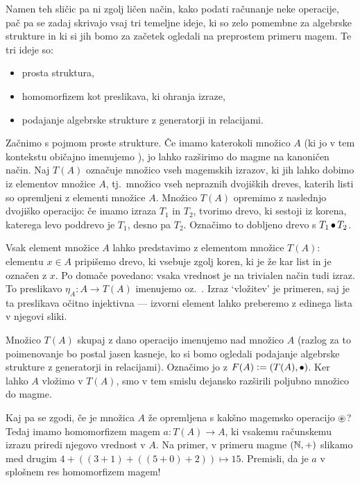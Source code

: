 
Namen teh sličic pa ni zgolj ličen način, kako podati računanje neke operacije, pač pa se zadaj skrivajo vsaj tri temeljne ideje, ki so zelo pomembne za algebrske strukture in ki si jih bomo za začetek ogledali na preprostem primeru magem. Te tri ideje so:
\begin{itemize}
	\item
		prosta struktura,
	\item
		homomorfizem kot preslikava, ki ohranja izraze,
	\item
		podajanje algebrske strukture z generatorji in relacijami.
\end{itemize}

Začnimo s pojmom proste strukture. Če imamo katerokoli množico $A$ (ki jo v tem kontekstu običajno imenujemo ), jo lahko razširimo do magme na kanoničen način. Naj $T(A)$ označuje množico vseh magemskih izrazov, ki jih lahko dobimo iz elementov množice $A$, tj.~množico vseh nepraznih dvojiških dreves, katerih listi so opremljeni z elementi množice $A$. Množico $T(A)$ opremimo z naslednjo dvojiško operacijo: če imamo izraza $T_1$ in $T_2$, tvorimo drevo, ki sestoji iz korena, katerega levo poddrevo je $T_1$, desno pa $T_2$. Označimo to dobljeno drevo s $T_1 \mathop{\bullet}\nolimits T_2$.

Vsak element množice $A$ lahko predstavimo z elementom množice $T(A)$: elementu $x \in A$ pripišemo drevo, ki vsebuje zgolj koren, ki je že kar list in je označen z $x$. Po domače povedano: vsaka vrednost je na trivialen način tudi izraz. To preslikavo $\eta_A\colon A \to T(A)$ imenujemo  oz.~. Izraz `vložitev' je primeren, saj je ta preslikava očitno injektivna --- izvorni element lahko preberemo z edinega lista v njegovi sliki.

Množico $T(A)$ skupaj z dano operacijo imenujemo  nad množico $A$ (razlog za to poimenovanje bo postal jasen kasneje, ko si bomo ogledali podajanje algebrske strukture z generatorji in relacijami). Označimo jo z $F(A) \mathrel{\mathop:}= (T(A), \mathop{\bullet}\nolimits)$. Ker lahko $A$ vložimo v $T(A)$, smo v tem smislu dejansko razširili poljubno množico do magme.

Kaj pa se zgodi, če je množica $A$ že opremljena s kakšno magemsko operacijo $\mathop{\circledast}\nolimits$? Tedaj imamo homomorfizem magem $a\colon T(A) \to A$, ki vsakemu računskemu izrazu priredi njegovo vrednost v $A$. Na primer, v primeru magme $(\mathbb{N}, +)$ slikamo med drugim $4 + ((3 + 1) + ((5 + 0) + 2)) \mapsto 15$. Premisli, da je $a$ v splošnem res homomorfizem magem!

